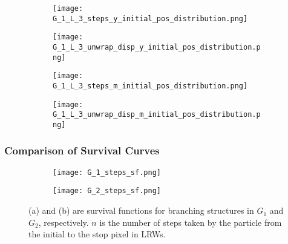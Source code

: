    \begin{figure}
        \centering
        \begin{subfigure}[b]{0.45\textwidth}
          \texttt{[image: G\_1\_L\_3\_steps\_y\_initial\_pos\_distribution.png]}
          \caption{}
          \label{fig:G_1_L_3_steps_yellow_initial_pos_distribution}
        \end{subfigure}
        
        \begin{subfigure}[b]{0.45\textwidth}
          \texttt{[image: G\_1\_L\_3\_unwrap\_disp\_y\_initial\_pos\_distribution.png]}
          \caption{}
          \label{fig:G_1_L_3_disp_yellow_initial_pos_distribution}
        \end{subfigure}
        \caption{}
        \label{fig:G_1_L_3_steps_disp_yellow}
   \end{figure}




   \begin{figure}
        \centering
        \begin{subfigure}[b]{0.45\textwidth}
          \texttt{[image: G\_1\_L\_3\_steps\_m\_initial\_pos\_distribution.png]}
          \caption{}
          \label{fig:G_1_L_3_steps_pink_initial_pos_distribution}
        \end{subfigure}
        
        \begin{subfigure}[b]{0.45\textwidth}
          \texttt{[image: G\_1\_L\_3\_unwrap\_disp\_m\_initial\_pos\_distribution.png]}
          \caption{}
          \label{fig:G_1_L_3_disp_pink_initial_pos_distribution}
        \end{subfigure}
        \caption{}
        \label{fig:G_1_L_3_steps_pink_yellow}
   \end{figure}

   

   
   
\subsubsection{Comparison of Survival Curves}


  \begin{figure}
        \centering 
        \begin{subfigure}[b]{0.45\textwidth}
          \texttt{[image: G\_1\_steps\_sf.png]}
          \caption{}
          \label{fig:sf_g1_branch_steps}
        \end{subfigure}
        \hfill
        \begin{subfigure}[b]{0.45\textwidth}
          \texttt{[image: G\_2\_steps\_sf.png]}
          \caption{}
          \label{fig:sf_g2_branch_steps}
        \end{subfigure}
        \caption{(a) and (b) are survival functions for branching
          structures in $G_1$ and $G_2$, respectively. $n$ is the
          number of steps taken by the particle from the initial to
          the stop pixel in LRWs.}
        \label{fig:sf_branch_steps}
  \end{figure}

